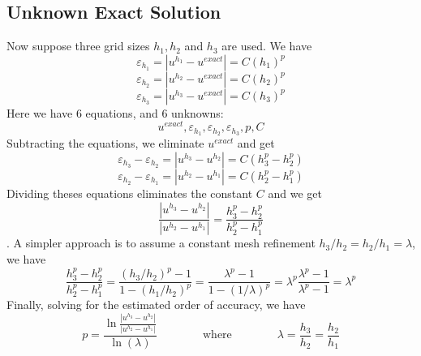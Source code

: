 \documentclass[11pt]{article}
\begin{document}
\subsection{Unknown Exact Solution}
Now suppose three grid sizes $h_1,h_2$ and $h_3$ are used. We have
\begin{equation}
	\varepsilon_{h_1} = |u^{h_1} - u^{exact}| = C (h_1)^p
\end{equation}
\begin{equation}
	\varepsilon_{h_2} = |u^{h_2} - u^{exact}| = C (h_2)^p
\end{equation}
\begin{equation}
	\varepsilon_{h_3} = |u^{h_3} - u^{exact}| = C (h_3)^p
\end{equation}
Here we have 6 equations, and 6 unknowns:
\begin{equation}
	u^{exact}, 
	\varepsilon_{h_1} , 
	\varepsilon_{h_2} , 
	\varepsilon_{h_3} , 
	p , 
	C
\end{equation}
Subtracting the equations, we eliminate $u^{exact}$ and get
\begin{equation}
	\varepsilon_{h_3}
	-
	\varepsilon_{h_2}
	=
	|u^{h_3} - u^{h_2}|
	=
	C (h_3^p - h_2^p)
\end{equation}
\begin{equation}
	\varepsilon_{h_2}
	-
	\varepsilon_{h_1}
	=
	|u^{h_2} - u^{h_1}|
	=
	C (h_2^p - h_1^p)
\end{equation}
Dividing theses equations eliminates the constant $C$ and we get
\begin{equation}
	\boxed{
	\frac{|u^{h_3} - u^{h_2}|}
	     {|u^{h_2} - u^{h_1}|}
	=
	\frac{h_3^p - h_2^p}{h_2^p - h_1^p}
	}
\end{equation}
. A simpler approach is to assume a constant mesh refinement $h_3/h_2 = h_2/h_1 = \lambda$, we have
\begin{equation}
	\frac{h_3^p - h_2^p}{h_2^p - h_1^p}
	=
	\frac{(h_3/h_2)^p - 1}{1 - (h_1/h_2)^p}
	=
	\frac{\lambda^p - 1}{1 - (1/\lambda)^p}
	=
	\lambda^p
	\frac{\lambda^p - 1}{\lambda^p - 1}
	=
	\lambda^p
\end{equation}
Finally, solving for the estimated order of accuracy, we have
\begin{equation}
	\boxed{
	p =
	\frac{\ln{\frac{|u^{h_3} - u^{h_2}|}
	     {|u^{h_2} - u^{h_1}|}}}{\ln(\lambda)}
	     }
     \qquad \qquad
     \text{where}
     \qquad \qquad
	\boxed{
	\lambda
	=
	\frac{h_3}{h_2}
	=
	\frac{h_2}{h_1}
	}
\end{equation}
\end{document}
